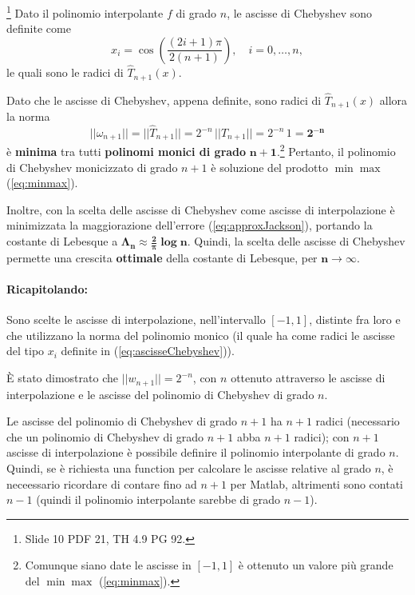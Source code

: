 \begin{definition}\footnote{Slide 10 PDF 21, TH 4.9 PG 92.}
    Dato il polinomio interpolante $f$ di grado $n$, le ascisse di Chebyshev sono definite come
    \begin{equation}\label{eq:ascisseChebyshev}
        x_i=\cos{\left(\frac{(2i+1)\pi}{2(n+1)}\right)},\quad i=0,\hdots,n,
    \end{equation}
    le quali sono le radici di $\widehat T_{n+1}(x)$.
\end{definition}

Dato che le ascisse di Chebyshev, appena definite, sono radici di $\widehat T_{n+1}(x)$ allora la norma
\begin{equation*}
    ||\omega_{n+1}||=||\widehat T_{n+1}||=2^{-n}\,||T_{n+1}||=2^{-n}\, 1 = \boldsymbol{2^{-n}}
\end{equation*}
è \textbf{minima} tra tutti \textbf{polinomi monici di grado} $\boldsymbol{n+1}$.\footnote{Comunque siano date le ascisse in $[-1,1]$ è ottenuto un valore più grande del $\min\max$ (\ref{eq:minmax}).} Pertanto, il polinomio di Chebyshev monicizzato di grado $n+1$ è soluzione del prodotto $\min\max$ (\ref{eq:minmax}). 

Inoltre, con la scelta delle ascisse di Chebyshev come ascisse di interpolazione è minimizzata la maggiorazione dell'errore (\ref{eq:approxJackson}), portando la costante di Lebesque a $\boldsymbol{\Lambda_n\approx\frac{2}{\pi}\log n}$. Quindi, la scelta delle ascisse di Chebyshev permette una crescita \textbf{ottimale} della costante di Lebesque, per $\boldsymbol{n\rightarrow\infty}$.

\paragraph{Ricapitolando:} Sono scelte le ascisse di interpolazione, nell'intervallo $[-1,1]$, distinte fra loro e che utilizzano la norma del polinomio monico (il quale ha come radici le ascisse del tipo $x_i$ definite in (\ref{eq:ascisseChebyshev})). 

È stato dimostrato che $||w_{n+1}||=2^{-n}$, con $n$ ottenuto attraverso le ascisse di interpolazione e le ascisse del polinomio di Chebyshev di grado $n$. 

Le ascisse del polinomio di Chebyshev di grado $n+1$ ha $n+1$ radici (necessario che un polinomio di Chebyshev di grado $n+1$ abba $n+1$ radici); con $n+1$ ascisse di interpolazione è possibile definire il polinomio interpolante di grado $n$. Quindi, se è richiesta una function per calcolare le ascisse relative al grado $n$, è neceessario ricordare di contare fino ad $n+1$ per Matlab, altrimenti sono contati $n-1$ (quindi il polinomio interpolante sarebbe di grado $n-1$).


